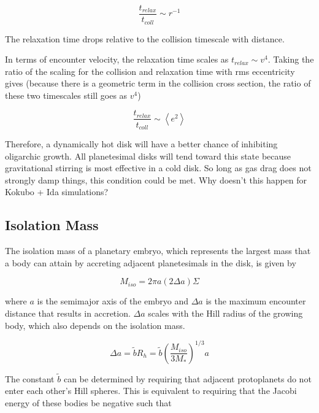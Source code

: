 \documentclass[onecolumn]{aastex63}
\begin{document}
\begin{equation}
    \frac{t_{relax}}{t_{coll}} \sim r^{-1}
\end{equation}

The relaxation time drops relative to the collision timescale with distance.

In terms of encounter velocity, the relaxation time scales as $t_{relax} \sim v^{4}$. Taking the ratio of the scaling for the collision and relaxation time with rms eccentricity gives (because there is a geometric term in the collision cross section, the ratio of these two timescales still goes as $v^{4}$)

\begin{equation}
    \frac{t_{relax}}{t_{coll}} \sim \left< e^{2} \right>
\end{equation}

Therefore, a dynamically hot disk will have a better chance of inhibiting oligarchic growth. All planetesimal disks will tend toward this state because gravitational stirring is most effective in a cold disk. So long as gas drag does not strongly damp things, this condition could be met. Why doesn't this happen for Kokubo + Ida simulations?

\subsection{Isolation Mass}

The isolation mass of a planetary embryo, which represents the largest mass that a body can attain by accreting adjacent planetesimals in the disk, is given by

\begin{equation}
    M_{iso} = 2 \pi a \left( 2 \Delta a \right) \Sigma
\end{equation}

\noindent where $a$ is the semimajor axis of the embryo and $\Delta a$ is the maximum encounter distance that results in accretion. $\Delta a$ scales with the Hill radius of the growing body, which also depends on the isolation mass.

\begin{equation}
    \Delta a = \tilde{b} R_{h} = \tilde{b} \left( \frac{M_{iso}}{3 M_{*}} \right)^{1/3} a
\end{equation}

The constant $\tilde{b}$ can be determined by requiring that adjacent protoplanets do not enter each other's Hill spheres. This is equivalent to requiring that the Jacobi energy of these bodies be negative such that \citep{Hayashi1977}
\end{document}
